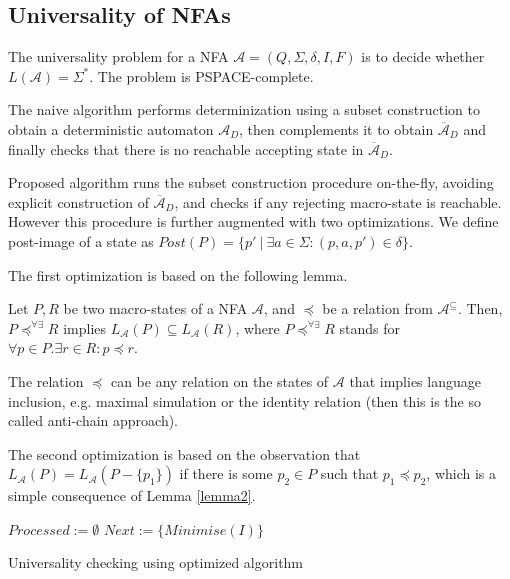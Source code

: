 \subsection{Universality of NFAs}\label{NFAuniv}

The universality problem for a NFA $\mathcal{A} = (Q, \Sigma, \delta, I, F)$ is to decide whether $L(\mathcal{A}) = \Sigma^*$. The problem is PSPACE-complete.

The naive algorithm performs determinization using a subset construction to obtain a deterministic automaton $\mathcal{A}_D$, then complements it to obtain $\overline{\mathcal{A}}_D$ and finally checks that there is no reachable accepting state in $\overline{\mathcal{A}}_D$.

Proposed algorithm \cite{tacas} runs the subset construction procedure on-the-fly, avoiding explicit construction of $\overline{\mathcal{A}}_D$, and checks if any rejecting macro-state is reachable. However this procedure is further augmented with two optimizations. We define post-image of a state as $Post(P) = \{p'\ |\ \exists a \in \Sigma: (p, a, p') \in \delta\}$.

The first optimization is based on the following lemma.

\begin{lemma}\label{lemma2}
 Let $P, R$ be two macro-states of a NFA $\mathcal{A}$, and $\preceq$ be a relation from $\mathcal{A}^\subseteq$. Then, $P \preceq^{\forall\exists} R$ implies $L_\mathcal{A}(P) \subseteq L_\mathcal{A}(R)$, where $P \preceq^{\forall\exists} R$ stands for $\forall p \in P. \exists r\in R : p \preceq r$.
\end{lemma}

The relation $\preceq$ can be any relation on the states of $\mathcal{A}$ that implies language inclusion, e.g. maximal simulation or the identity relation (then this is the so called anti-chain approach).

The second optimization is based on the observation that $L_\mathcal{A}(P) = L_\mathcal{A}(P - \{p_1\})$ if there is some $p_2 \in P$ such that $p_1 \preceq  p_2$, which is a simple consequence of Lemma \ref{lemma2}.

\begin{algorithm}[hb!]
		\BlankLine
		$Processed := \emptyset$\;
		$Next := \{Minimise(I)\}$\;
		\caption{Universality checking using optimized algorithm \cite{tacas}}\label{universality}
	\end{algorithm}
	
